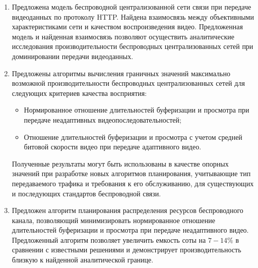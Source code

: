 \begin{enumerate}
    \item Предложена модель беспроводной централизованной сети связи при передаче видеоданных по протоколу HTTP. Найдена взаимосвязь между объективными характеристиками сети и качеством воспроизведения видео. Предложенная модель и найденная взаимосвязь позволяют осуществить аналитические исследования производительности беспроводных централизованных сетей при доминировании передачи видеоданных.
    \item Предложены алгоритмы вычисления граничных значений максимально возможной производительности беспроводных централизованных сетей для следующих критериев качества восприятия:
    \begin{itemize}
	    \item Нормированное отношение длительностей буферизации и просмотра при передаче неадаптивных видеопоследовательностей;
	    \item Отношение длительностей буферизации и просмотра с учетом средней битовой скорости видео при передаче адаптивного видео.
    \end{itemize}
    Полученные результаты могут быть использованы в качестве опорных значений при разработке новых алгоритмов планирования, учитывающие тип передаваемого трафика и требования к его обслуживанию, для существующих и последующих стандартов беспроводной связи.
    \item Предложен алгоритм планирования распределения ресурсов беспроводного канала, позволяющий минимизировать нормированное отношение длительностей буферизации и просмотра при передаче неадаптивного видео. Предложенный алгоритм позволяет увеличить емкость соты на $7-14\%$ в сравнении с известными решениями и демонстрирует производительность близкую к найденной аналитической границе.
\end{enumerate}
